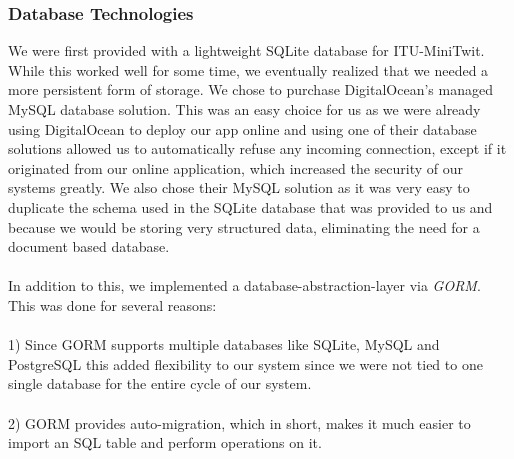 \documentclass{article}
\begin{document}
\subsubsection{Database Technologies}
We were first provided with a lightweight SQLite database for ITU-MiniTwit. While this worked well for some time, we eventually realized that we needed a more persistent form of storage. We chose to purchase DigitalOcean's managed MySQL database solution. This was an easy choice for us as we were already using DigitalOcean to deploy our app online and using one of their database solutions allowed us to automatically refuse any incoming connection, except if it originated from our online application, which increased the security of our systems greatly. We also chose their MySQL solution as it was very easy to duplicate the schema used in the SQLite database that was provided to us and because we would be storing very structured data, eliminating the need for a document based database.
\\\\
In addition to this, we implemented a database-abstraction-layer via \textit{GORM}. This was done for several reasons:
\\\\
1) Since GORM supports multiple databases like SQLite, MySQL and PostgreSQL this added flexibility to our system since we were not tied to one single database for the entire cycle of our system.
\\\\
2) GORM provides auto-migration, which 
in short, makes it much easier to import an SQL table and perform operations on it. 
\end{document}
